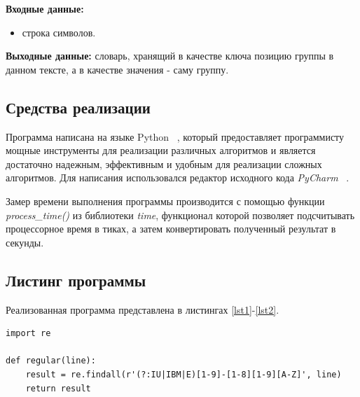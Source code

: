 \documentclass[a4paper,12pt]{article}
\begin{document}
\begin{flushleft}
	\textbf{Входные данные:} 
	\begin{itemize}
		\item строка символов.
	\end{itemize}
	
	\textbf{Выходные данные:} словарь, хранящий в качестве ключа позицию группы в данном тексте, а в качестве значения - саму группу.
\end{flushleft}

\subsection{Средства реализации}

Программа написана на языке Python ~\cite{python}, который 
предоставляет программисту мощные инструменты для реализации различных алгоритмов и является достаточно 
надежным, эффективным и удобным для реализации сложных алгоритмов. Для написания использовался 
редактор исходного кода \textit{PyCharm} ~\cite{pycharm}.

Замер времени выполнения программы 
производится с помощью функции \textit{process\_time()} из библиотеки \textit{time},
функционал которой позволяет подсчитывать процессорное время в тиках,
а затем конвертировать полученный результат в секунды.

\subsection{Листинг программы}

Реализованная программа представлена
в листингах \ref{lst1}-\ref{lst2}.

\begin{lstlisting}[label=lst1,caption=Реализация программы с использованием регулярных выражений]
import re

def regular(line):
	result = re.findall(r'(?:IU|IBM|E)[1-9]-[1-8][1-9][A-Z]', line)
	return result
\end{lstlisting}
\end{document}
